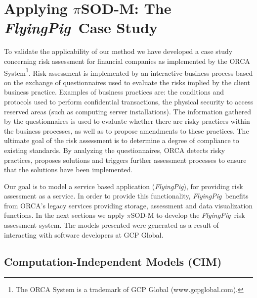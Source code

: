 \documentclass{singlecol-new}
\theoremstyle{TH}{
\newtheorem{lemma}{Lemma}
\newtheorem{theorem}[lemma]{Theorem}
\newtheorem{corrolary}[lemma]{Corrolary}
\newtheorem{conjecture}[lemma]{Conjecture}
\newtheorem{proposition}[lemma]{Proposition}
\newtheorem{claim}[lemma]{Claim}
\newtheorem{stheorem}[lemma]{Wrong Theorem}
\newtheorem{algorithm}{Algorithm}
}
\theoremstyle{THrm}{
\newtheorem{definition}{Definition}[section]
\newtheorem{question}{Question}[section]
\newtheorem{remark}{Remark}
\newtheorem{scheme}{Scheme}
}
\theoremstyle{THhit}{
\newtheorem{case}{Case}[section]
}
\theoremstyle{THhsl}{
\newtheorem{example}{Example}
}
\newcommand{\pisodm}[0]{$\pi$SOD-M\xspace}
\def\FlyingPig{\textsl{FlyingPig}\xspace}
\begin{document}
\section{Applying \pisodm: The \FlyingPig\ Case Study}
\label{sec:flyingPig}


To validate the applicability of our method we have developed a case study concerning risk assessment for financial companies as implemented by the ORCA System\footnote{The ORCA System is a trademark of GCP Global (www.gcpglobal.com).}.%
Risk assessment is implemented by an interactive business process based on the exchange of questionnaires used to evaluate the risks implied by the client business practice.
Examples of business practices are: the conditions and protocols used to perform confidential transactions, the physical security to access reserved areas (such as computing server installations).
The information gathered by the questionnaires is used to evaluate whether there are risky practices within the business processes, as well as to propose amendments to these practices.
The ultimate goal of the risk assessment is to determine a degree of compliance to existing standards.
By analyzing the questionnaires, ORCA detects risky practices, proposes solutions and triggers further assessment processes to ensure that the solutions have been implemented.

Our goal is to model a service based application (\FlyingPig), for providing risk assessment as a service.
In order to provide this functionality, \FlyingPig\ benefits from ORCA's legacy services providing storage, assessment and data visualization functions.
%
In the next sections we apply \pisodm to develop the \FlyingPig\ risk assessment system.
The models presented were generated as a result of interacting with software developers at GCP Global.



\subsection{Computation-Independent Models (CIM)}
\end{document}
